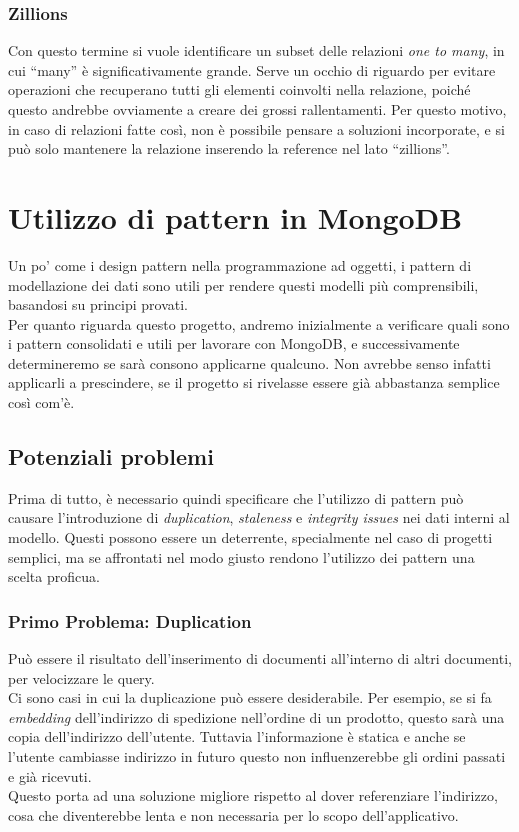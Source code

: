\subsubsection{Zillions}
Con questo termine si vuole identificare un subset delle relazioni \textit{one to many}, in cui ``many'' è significativamente grande. Serve un occhio di riguardo per evitare operazioni che recuperano tutti gli elementi coinvolti nella relazione, poiché questo andrebbe ovviamente a creare dei grossi rallentamenti.
Per questo motivo, in caso di relazioni fatte così, non è possibile pensare a soluzioni incorporate, e si può solo mantenere la relazione inserendo la reference nel lato ``zillions''.

\section{Utilizzo di pattern in MongoDB}
Un po' come i \gls{design pattern} nella programmazione ad oggetti, i pattern di modellazione dei dati sono utili per rendere questi modelli più comprensibili, basandosi su principi provati.\\
Per quanto riguarda questo progetto, andremo inizialmente a verificare quali sono i pattern consolidati e utili per lavorare con MongoDB, e successivamente determineremo se sarà consono applicarne qualcuno. Non avrebbe senso infatti applicarli a prescindere, se il progetto si rivelasse essere già abbastanza semplice così com'è.\\

\subsection{Potenziali problemi}
Prima di tutto, è necessario quindi specificare che l'utilizzo di pattern può causare l'introduzione di \textit{duplication}, \textit{staleness} e \textit{integrity issues} nei dati interni al modello. Questi possono essere un deterrente, specialmente nel caso di progetti semplici, ma se affrontati nel modo giusto rendono l'utilizzo dei pattern una scelta proficua.\\

\subsubsection{Primo Problema: Duplication}
Può essere il risultato dell'inserimento di documenti all'interno di altri documenti, per velocizzare le query.\\
Ci sono casi in cui la duplicazione può essere desiderabile. Per esempio, se si fa \textit{embedding} dell'indirizzo di spedizione nell'ordine di un prodotto, questo sarà una copia dell'indirizzo dell'utente. Tuttavia l'informazione è statica e anche se l'utente cambiasse indirizzo in futuro questo non influenzerebbe gli ordini passati e già ricevuti.\\
Questo porta ad una soluzione migliore rispetto al dover referenziare l'indirizzo, cosa che diventerebbe lenta e non necessaria per lo scopo dell'applicativo.\\

